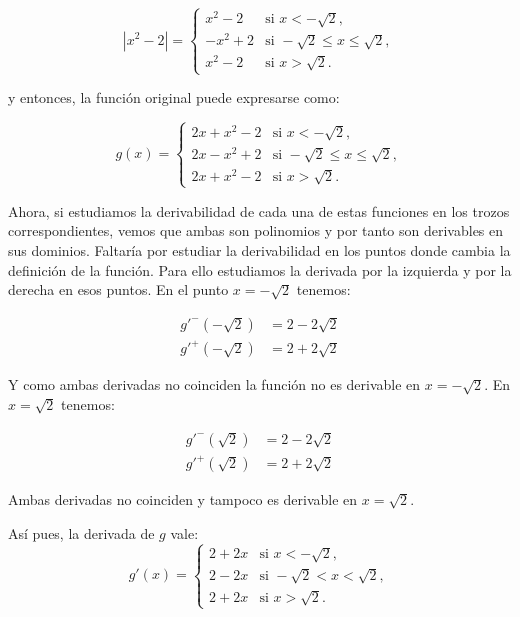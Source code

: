 \documentclass[
  a4paper,
]{scrreport}
\theoremstyle{definition}
\theoremstyle{remark}
\begin{document}
\begin{tcolorbox}
\begin{enumerate}
  \[
   |x^2-2| =
   \begin{cases}
   x^2-2 & \mbox{si } x<-\sqrt{2}, \\
   -x^2+2 & \mbox{si } -\sqrt{2} \leq x \leq \sqrt{2},\\
   x^2-2 & \mbox{si } x > \sqrt{2}.
   \end{cases}
   \]

  y entonces, la función original puede expresarse como:

  \[
   g(x) =
   \begin{cases}
   2x+x^2-2 & \mbox{si } x< -\sqrt{2}, \\
   2x-x^2+2 & \mbox{si } -\sqrt{2} \leq x \leq \sqrt{2},\\
   2x+x^2-2 & \mbox{si } x > \sqrt{2}.
   \end{cases}
   \]

  Ahora, si estudiamos la derivabilidad de cada una de estas funciones
  en los trozos correspondientes, vemos que ambas son polinomios y por
  tanto son derivables en sus dominios. Faltaría por estudiar la
  derivabilidad en los puntos donde cambia la definición de la función.
  Para ello estudiamos la derivada por la izquierda y por la derecha en
  esos puntos. En el punto \(x=-\sqrt 2\) tenemos:

  \begin{align*}
   g'^-(-\sqrt{2}) &= 2-2\sqrt 2\\
   g'^+(-\sqrt{2}) &= 2+2\sqrt 2
   \end{align*}

  Y como ambas derivadas no coinciden la función no es derivable en
  \(x=-\sqrt 2\). En \(x=\sqrt{2}\) tenemos:

  \begin{align*}
   g'^-(\sqrt{2}) &= 2-2\sqrt 2\\
   g'^+(\sqrt{2}) &= 2+2\sqrt 2
   \end{align*}

  Ambas derivadas no coinciden y tampoco es derivable en \(x=\sqrt 2\).

  Así pues, la derivada de \(g\) vale: \[
   g'(x)=
   \begin{cases}
   2+2x & \mbox{si } x< -\sqrt{2}, \\
   2-2x & \mbox{si } -\sqrt{2} < x < \sqrt{2},\\
   2+2x & \mbox{si } x > \sqrt{2}.
   \end{cases}
   \]
\end{enumerate}

\end{tcolorbox}
\end{document}
